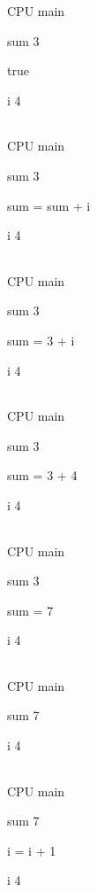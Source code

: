 \documentclass[
]{article}
\begin{document}
CPU main

sum 3

true

i 4

\begin{longtable}[]{@{}@{}}
\toprule
\endhead
\bottomrule
\end{longtable}

CPU main

sum 3

sum = sum + i

i 4

\begin{longtable}[]{@{}@{}}
\toprule
\endhead
\bottomrule
\end{longtable}

CPU main

sum 3

sum = 3 + i

i 4

\begin{longtable}[]{@{}@{}}
\toprule
\endhead
\bottomrule
\end{longtable}

CPU main

sum 3

sum = 3 + 4

i 4

\begin{longtable}[]{@{}@{}}
\toprule
\endhead
\bottomrule
\end{longtable}

CPU main

sum 3

sum = 7

i 4

\begin{longtable}[]{@{}@{}}
\toprule
\endhead
\bottomrule
\end{longtable}

CPU main

sum 7

i 4

\begin{longtable}[]{@{}@{}}
\toprule
\endhead
\bottomrule
\end{longtable}

CPU main

sum 7

i = i + 1

i 4

\begin{longtable}[]{@{}@{}}
\toprule
\endhead
\bottomrule
\end{longtable}
\end{document}
